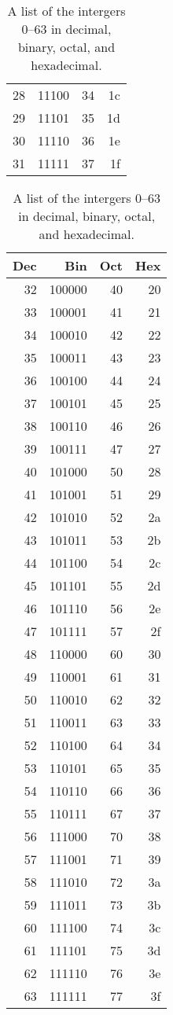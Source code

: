 \begin{table}
\begin{tabular}{|r|r|r|r|}
    28 & 11100 & 34 & 1c\\
    29 & 11101 & 35 & 1d\\
    30 & 11110 & 36 & 1e \\
    31 & 11111 & 37 & 1f\\
    \hline
  \end{tabular}
  \begin{tabular}{|r|r|r|r|}
    \hline
    Dec & Bin & Oct & Hex\\
    \hline
    32 & 100000 & 40 & 20\\
    33 & 100001 & 41 & 21\\
    34 & 100010 & 42 & 22\\
    35 & 100011 & 43 & 23 \\
    36 & 100100 & 44 & 24\\
    37 & 100101 & 45& 25\\
    38 & 100110 & 46 & 26 \\
    39 & 100111 & 47 & 27 \\
    40 & 101000 & 50 & 28\\
    41 & 101001 & 51 & 29\\
    42 & 101010 & 52 & 2a\\
    43 & 101011 & 53 & 2b\\
    44 & 101100 & 54 & 2c\\
    45 & 101101 & 55 & 2d\\
    46 & 101110 & 56 & 2e \\
    47 & 101111 & 57 & 2f\\
    48 & 110000 & 60 & 30\\
    49 & 110001 & 61 & 31\\
    50 & 110010 & 62 & 32\\
    51 & 110011 & 63 & 33 \\
    52 & 110100 & 64 & 34\\
    53 & 110101 & 65 & 35\\
    54 & 110110 & 66 & 36 \\
    55 & 110111 & 67 & 37 \\
    56 & 111000 & 70 & 38\\
    57 & 111001 & 71 & 39\\
    58 & 111010 & 72 & 3a\\
    59 & 111011 & 73 & 3b\\
    60 & 111100 & 74 & 3c\\
    61 & 111101 & 75 & 3d\\
    62 & 111110 & 76 & 3e \\
    63 & 111111 & 77 & 3f\\
    \hline
  \end{tabular}
  \caption{A list of the intergers 0--63 in decimal, binary, octal, and hexadecimal.}
  \label{tab:binaryTable}
\end{table}
